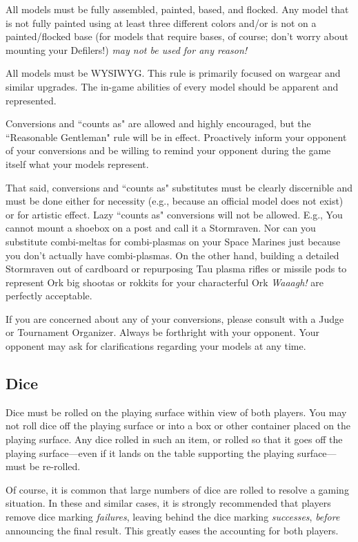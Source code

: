 \documentclass[12pt,titlepage]{article}
\begin{document}
All models must be fully assembled, painted, based, and flocked. Any model that is not fully painted using at least three different colors and/or is not on a painted/flocked base (for models that require bases, of course; don't worry about mounting your Defilers!) \textit{may not be used for any reason!}

All models must be WYSIWYG. This rule is primarily focused on wargear and similar upgrades. The in-game abilities of every model should be apparent and represented.

Conversions and ``counts as" are allowed and highly encouraged, but the ``Reasonable Gentleman" rule will be in effect. Proactively inform your opponent of your conversions and be willing to remind your opponent during the game itself what your models represent.

That said, conversions and ``counts as" substitutes must be clearly discernible and must be done either for necessity (e.g., because an official model does not exist) or for artistic effect. Lazy ``counts as" conversions will not be allowed. E.g., You cannot mount a shoebox on a post and call it a Stormraven. Nor can you substitute combi-meltas for combi-plasmas on your Space Marines just because you don't actually have combi-plasmas. On the other hand, building a detailed Stormraven out of cardboard or repurposing Tau plasma rifles or missile pods to represent Ork big shootas or rokkits for your characterful Ork \textit{Waaagh!} are perfectly acceptable.

If you are concerned about any of your conversions, please consult with a Judge or Tournament Organizer. Always be forthright with your opponent. Your opponent may ask for clarifications regarding your models at any time.

\subsection*{Dice}

Dice must be rolled on the playing surface within view of both players. You may not roll dice off the playing surface or into a box or other container placed on the playing surface. Any dice rolled in such an item, or rolled so that it goes off the playing surface---even if it lands on the table supporting the playing surface---must be re-rolled.

Of course, it is common that large numbers of dice are rolled to resolve a gaming situation. In these and similar cases, it is strongly recommended that players remove dice marking \textit{failures}, leaving behind the dice marking \textit{successes}, \textit{before} announcing the final result. This greatly eases the accounting for both players.
\end{document}
